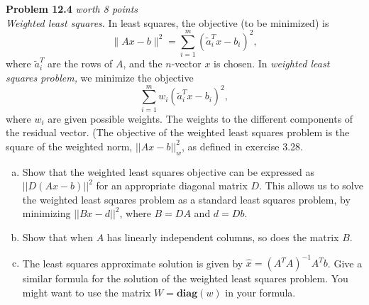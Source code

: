 \documentclass{article}
\newenvironment{problem}[3][Problem]
    { \begin{mdframed}[backgroundcolor=gray!20] \textbf{#1 #2} \textit{worth #3 points} \\}
    {  \end{mdframed}}
\begin{document}
\begin{problem}{12.4}{8}
\textit{Weighted least squares}. In least squares, the objective (to be minimized) is $$\|A x-b\|^{2}=\sum_{i=1}^{m}\left(\tilde{a}_{i}^{T} x-b_{i}\right)^{2},$$ where $\tilde{a}_i^T$ are the rows of $A$, and the $n$-vector $x$ is chosen. In \textit{weighted least squares problem,} we minimize the objective $$\sum_{i=1}^{m}w_i\left(\tilde{a}_{i}^{T} x-b_{i}\right)^{2},$$ where $w_i$ are given possible weights. The weights to the different components of the residual vector. (The objective of the weighted least squares problem is the square of the weighted norm, $\lvert\lvert Ax-b\rvert\rvert_{w}^2$, as defined in exercise {\color{red} 3.28}.
\begin{enumerate}[(a)]
    \item Show that the weighted least squares objective can be expressed as $\lvert\lvert D(Ax-b)\rvert\rvert^2$ for an appropriate diagonal matrix $D$. This allows us to solve the weighted least squares problem as a standard least squares problem, by minimizing $\lvert\lvert Bx-d\rvert\rvert^2$, where $B = DA$ and $d = Db$.
    \item Show that when $A$ has linearly independent columns, so does the matrix $B$.
    \item The least squares approximate solution is given by $\hat{x}=(A^TA)^{-1}A^Tb$. Give a similar formula for the solution of the weighted least squares problem. You might want to use the matrix $W=\textbf{diag}(w)$ in your formula. 
\end{enumerate}
\end{problem}
\end{document}
